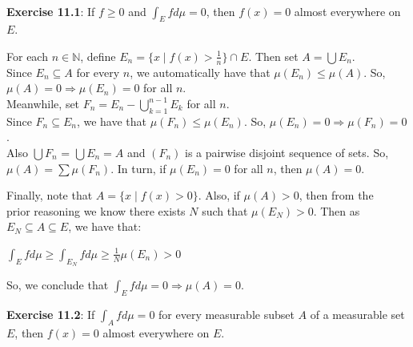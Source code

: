 \documentclass{book}
\newcommand{\exOne}{%
   \color{Purple}%
   \fontsize{14}{16}\selectfont%
}
\newcommand{\exTwo}{%
   \color{RedViolet}%
   \fontsize{13}{15}\selectfont%
}
\newenvironment{myIndent}{%
   \begin{adjustwidth}{2.5em}{0em}%
}{%
   \end{adjustwidth}%
}
\newcommand{\mySepTwo}[1][.]{%
   {\noindent\color{#1}{\rule{6.5in}{0.5mm}}}\\%
}
\newcommand{\retTwo}{\hfill\bigbreak}
\begin{document}
\newpage

\exOne
\mySepTwo

\textbf{Exercise 11.1}: If $f \geq 0$ and $\int_E fd\mu = 0$, then $f(x) = 0$ almost everywhere on $E$.\\ [-8pt]

{\begin{myIndent}\exTwo
   For each $n \in \mathbb{N}$, define $E_n = \{x \mid f(x) > \frac{1}{n}\} \cap E$. Then set $A = \bigcup E_n$.\\ Since $E_n \subseteq A$ for every $n$, we automatically have that $\mu(E_n) \leq \mu(A)$. So,\\ $\mu(A) = 0 \Longrightarrow \mu(E_n) = 0$ for all $n$.\\ [-6pt]

   Meanwhile, set $F_n = E_n - \bigcup\limits_{k=1}^{n-1} E_k$ for all $n$.\\ [-2pt] 
   
   Since $F_n \subseteq E_n$, we have that $\mu(F_n) \leq \mu(E_n)$. So, $\mu(E_n) = 0 \Longrightarrow \mu(F_n) = 0$.\\ Also $\bigcup F_n$ = $\bigcup E_n = A$ and $(F_n)$ is a pairwise disjoint sequence of sets. So,\\ $\mu(A) = \sum \mu(F_n)$. In turn, if $\mu(E_n) = 0$ for all $n$, then $\mu(A) = 0$.\retTwo

   Finally, note that $A = \{x \mid f(x) > 0\}$. Also, if $\mu(A) > 0$, then from the\\ prior reasoning we know there exists $N$ such that $\mu(E_N) > 0$. Then as\\ $E_N \subseteq A \subseteq E$, we have that:

   {\centering $\int_E fd\mu \geq \int_{E_N} fd\mu \geq \frac{1}{N}\mu(E_n) > 0$ \retTwo\par}

   So, we conclude that $\int_E fd\mu = 0 \Longrightarrow \mu(A) = 0$.\retTwo
\end{myIndent}}

\textbf{Exercise 11.2}: If $\int_A fd\mu = 0$ for every measurable subset $A$ of a measurable set\\ $E$, then $f(x) = 0$ almost everywhere on $E$.\\ [-6pt]
\end{document}
